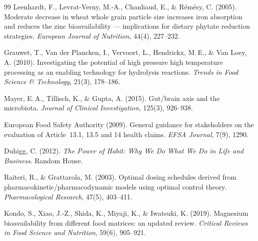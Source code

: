﻿\documentclass[12pt,a4paper]{article}
\theoremstyle{plain}
\theoremstyle{definition}
\theoremstyle{remark}
\begin{document}
\begin{thebibliography}{99}
Leenhardt, F., Levrat-Verny, M.-A., Chanliaud, E., \& Rémésy, C. (2005).
Moderate decrease in wheat whole grain particle size increases iron
absorption and reduces the zinc bioavailability --- implications for
dietary phytate reduction strategies.
\textit{European Journal of Nutrition}, 44(4), 227--232.

Grauwet, T., Van der Plancken, I., Vervoort, L., Hendrickx, M.\,E., \&
Van Loey, A. (2010).
Investigating the potential of high pressure high temperature processing
as an enabling technology for hydrolysis reactions.
\textit{Trends in Food Science \& Technology}, 21(3), 178--186.

Mayer, E.\,A., Tillisch, K., \& Gupta, A. (2015).
Gut/brain axis and the microbiota.
\textit{Journal of Clinical Investigation}, 125(3), 926--938.

European Food Safety Authority (2009).
General guidance for stakeholders on the evaluation of Article~13.1,
13.5 and 14 health claims.
\textit{EFSA Journal}, 7(9), 1290.

Duhigg, C. (2012).
\textit{The Power of Habit: Why We Do What We Do in Life and Business}.
Random House.

Raiteri, R., \& Grattarola, M. (2003).
Optimal dosing schedules derived from pharmacokinetic/pharmacodynamic
models using optimal control theory.
\textit{Pharmacological Research}, 47(5), 403--411.

Kondo, S., Xiao, J.-Z., Shida, K., Miyaji, K., \& Iwatsuki, K. (2019).
Magnesium bioavailability from different food matrices: an updated
review.
\textit{Critical Reviews in Food Science and Nutrition}, 59(6),
905--921.

\end{thebibliography}
\end{document}

